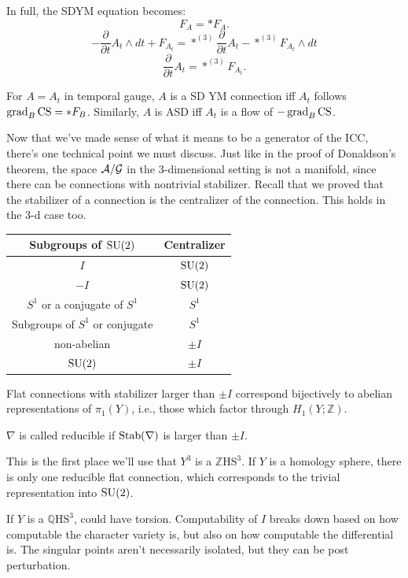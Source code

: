\documentclass[main]{subfiles}
\begin{document}
In full, the SDYM equation becomes:
\[
F_A = \ast F_A.
\]
\[
-\frac{\partial}{\partial t}A_t\wedge dt + F_{A_t} = \ast^{(3)}\frac{\partial}{\partial t}A_t - \ast^{(3)}F_{A_t}\wedge dt
\]
\[
\frac{\partial}{\partial t}A_t = \ast^{(3)}F_{A_t}.
\]

For $A=A_t$ in temporal gauge, $A$ is a SD YM connection iff $A_t$ follows $\operatorname{grad}_B\operatorname{CS} = \ast F_B$. Similarly, $A$ is ASD iff $A_t$ is a flow of $-\operatorname{grad}_B\operatorname{CS}$.

Now that we've made sense of what it means to be a generator of the ICC, there's one technical point we must discuss. Just like in the proof of Donaldson's theorem, the space $\mathcal{A}/\mathcal{G}$ in the $3$-dimensional setting is not a manifold, since there can be connections with nontrivial stabilizer. Recall that we proved that the stabilizer of a connection is the centralizer of the connection. This holds in the $3$-d case too.

\begin{center}
\begin{tabular}{c|c}
Subgroups of $\operatorname{SU}(2)$ & Centralizer \\
\hline
$I$ & $\operatorname{SU}(2)$ \\
$-I$ & $\operatorname{SU}(2)$ \\
$S^1$ or a conjugate of $S^1$ & $S^1$ \\
Subgroups of $S^1$ or conjugate & $S^1$ \\
non-abelian & $\pm I$ \\
$\operatorname{SU}(2)$ & $\pm I$
\end{tabular}
\end{center}

\begin{lemma}
Flat connections with stabilizer larger than $\pm I$ correspond bijectively to abelian representations of $\pi_1(Y)$, i.e., those which factor through $H_1(Y;\mathbb{Z})$.
\end{lemma}

\begin{definition}
$\nabla$ is called reducible if $\operatorname{Stab}(\nabla)$ is larger than $\pm I$.
\end{definition}

This is the first place we'll use that $Y^3$ is a $\mathbb{Z}\mathrm{HS}^3$. If $Y$ is a homology sphere, there is only one reducible flat connection, which corresponds to the trivial representation into $\operatorname{SU}(2)$.

\begin{remark}
If $Y$ is a $\mathbb{Q}\mathrm{HS}^3$, could have torsion. Computability of $I$ breaks down based on how computable the character variety is, but also on how computable the differential is. The singular points aren't necessarily isolated, but they can be post perturbation.
\end{remark}
\end{document}
